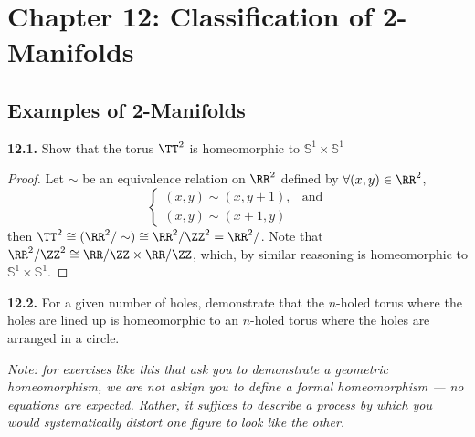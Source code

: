 \documentclass{fkbook}
\newenvironment{problem}[1][Problem \thesection.]
{\noindent\begin{boxedminipage}{\linewidth}\textbf{#1.}}
{\end{boxedminipage}}
\begin{document}
\mainmatter
\pagestyle{main}
\chapter{Chapter 12: Classification of 2-Manifolds}

\section{Examples of 2-Manifolds}
\begin{problem}[12.1]
  Show that the torus $\TT^2$ is homeomorphic to $\mathbb{S}^1 \times
  \mathbb{S}^1$
\end{problem}
\begin{proof}
  Let $\sim$ be an equivalence relation on $\RR^2$ defined by $\forall (x,y) \in
  \RR^2$,
  \[
    \begin{cases}
      (x,y) \sim (x,y+1), & \text{and} \\
      (x,y) \sim (x+1, y)
    \end{cases}
  \]
  then $\TT^2 \cong (\RR^2 / \sim) \cong \RR^2 / \ZZ^2 = \RR^2 / $. Note that
  $\RR^2/\ZZ^2 \cong \RR/\ZZ \times \RR/\ZZ$, which, by similar reasoning is
  homeomorphic to $\mathbb{S}^1 \times \mathbb{S}^1$.
\end{proof}
\begin{problem}[12.2]
  For a given number of holes, demonstrate that the $n$-holed torus where the
  holes are lined up is homeomorphic to an $n$-holed torus where the holes are
  arranged in a circle.

  \emph{Note: for exercises like this that ask you to demonstrate a geometric
    homeomorphism, we are not askign you to define a formal homeomorphism --- no
    equations are expected. Rather, it suffices to describe a process by which
    you would systematically distort one figure to look like the other.}
\end{problem}
\end{document}
